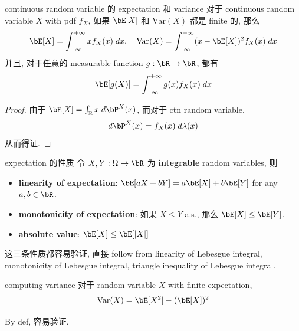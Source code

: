 \begin{proposition}{continuous random variable 的 expectation 和 variance}\label{continuous random variable 的 expectation 和 variance}
    对于 continuous random variable \(X\) with pdf \(f_X\), 如果 \(\bE[X]\) 和 \(\text{Var}(X)\) 都是 finite 的, 那么
    \[
    \bE[X] = \int_{-\infty}^{+\infty} x f_X(x) \;dx, \quad \text{Var}(X) = \int_{-\infty}^{+\infty} (x-\bE[X])^2 f_X(x) \;dx
    \]
    并且, 对于任意的 measurable function \(g: \bR \to \bR\), 都有
    \[
    \bE[g(X)] = \int_{-\infty}^{+\infty} g(x) f_X(x) \;dx
    \]
\end{proposition}
\begin{proof}
    由于 \(\bE[X] = \int_{\mathbb{R}} x \;d\bP^X(x)\), 而对于 ctn random variable, \[
    d\bP^X(x) = f_X(x) \;d\lambda(x)
    \]
    从而得证.
\end{proof}


\begin{proposition}{expectation 的性质}
令 \(X,Y:\Omega \to \bR\) 为 \textbf{integrable} random variables,  则
\begin{itemize}
    \item \textbf{linearity of expectation}: \(\bE[aX + bY] = a\bE[X] + b\bE[Y]\) for any \(a,b \in \bR\).
    \item \textbf{monotonicity of expectation}: 如果 \(X \leq Y\) a.s., 那么 \(\bE[X] \leq \bE[Y]\).
    \item \textbf{absolute value}: \(\bE[X] \leq \bE[|X|]\)
\end{itemize}
\end{proposition}
这三条性质都容易验证, 直接 follow from linearity of Lebesgue integral,
 monotonicity of Lebesgue integral, triangle inequality of Lebesgue integral.



\begin{proposition}{computing variance}
    对于 random variable \(X\) with finite expectation, 
    \[
    \text{Var}(X) = \bE[X^2] - (\bE[X])^2
    \]
\end{proposition}
By def, 容易验证.









